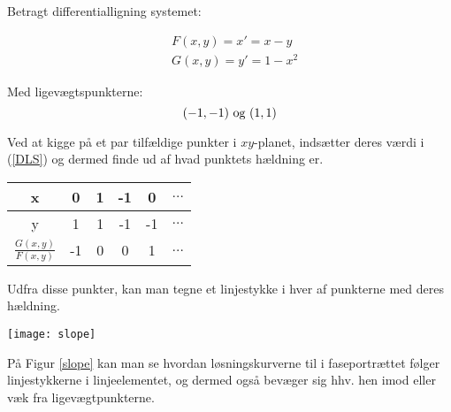 \begin{Example}
\hfill \break
\textnormal{Betragt differentialligning systemet:} 

\begin{equation}\label{DLS}
    \begin{aligned}
    &F(x,y)= x'=x-y\\ 
    &G(x,y)=y'=1-x^2
    \end{aligned}
\end{equation}

\textnormal{Med ligevægtspunkterne:} $$(-1,-1) \ \textnormal{og} \ (1,1)$$
\textnormal{}

\textnormal{Ved at kigge på et par tilfældige punkter i $xy$-planet, indsætter deres værdi i (\ref{DLS}) og dermed finde ud af hvad punktets hældning er.} 

\begin{center}
  \begin{tabular}{ | c || c | c | c | c | c |}
    \hline
    x & 0 & 1 & -1 & 0 & $\hdots$ \\ \hline 
    y & 1 & 1 & -1 & -1 & $\hdots$\\ \hline
    $\frac{G(x,y)}{F(x,y)}$ & -1 & 0 & 0 & 1 & $\hdots$\\ \hline
  \end{tabular}
\end{center}

\textnormal{Udfra disse punkter, kan man tegne et linjestykke i hver af punkterne med deres hældning.}

\begin{center}
\texttt{[image: slope]}
\end{center}
\label{slope}
\hfill \break

\textnormal{På Figur \ref{slope} kan man se hvordan løsningskurverne til i faseportrættet følger linjestykkerne i linjeelementet, og dermed også bevæger sig hhv. hen  imod eller væk fra ligevægtpunkterne.}

\end{Example}

